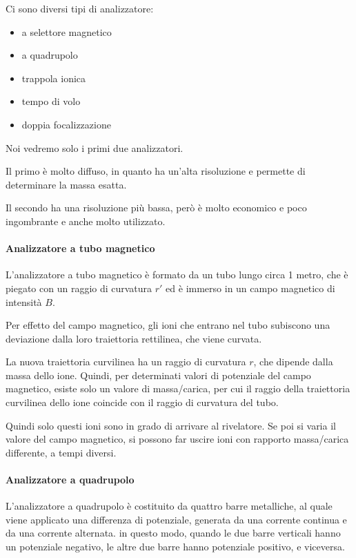 Ci sono diversi tipi di analizzatore:
\begin{itemize}
  \item a selettore magnetico
  \item a quadrupolo
  \item trappola ionica
  \item tempo di volo
  \item doppia focalizzazione
\end{itemize}

Noi vedremo solo i primi due analizzatori.

Il primo è molto diffuso, in quanto ha un'alta risoluzione e permette di
determinare la massa esatta.

Il secondo ha una risoluzione più bassa, però è molto economico e poco
ingombrante e anche molto utilizzato.

\paragraph{Analizzatore a tubo magnetico}

L'analizzatore a tubo magnetico è formato da un tubo lungo circa 1
metro, che è piegato con un raggio di curvatura \(r'\) ed è immerso in
un campo magnetico di intensità \(B\).

Per effetto del campo magnetico, gli ioni che entrano nel tubo subiscono
una deviazione dalla loro traiettoria rettilinea, che viene curvata.


La nuova traiettoria curvilinea ha un raggio di curvatura \(r\), che
dipende dalla massa dello ione. Quindi, per determinati valori di
potenziale del campo magnetico, esiste solo un valore di massa/carica,
per cui il raggio della traiettoria curvilinea dello ione coincide con
il raggio di curvatura del tubo.

Quindi solo questi ioni sono in grado di arrivare al rivelatore. Se poi
si varia il valore del campo magnetico, si possono far uscire ioni con
rapporto massa/carica differente, a tempi diversi.

\paragraph{Analizzatore a quadrupolo}

L'analizzatore a quadrupolo è costituito da quattro barre metalliche, al
quale viene applicato una differenza di potenziale, generata da una
corrente continua e da una corrente alternata. in questo modo, quando le
due barre verticali hanno un potenziale negativo, le altre due barre
hanno potenziale positivo, e viceversa.


